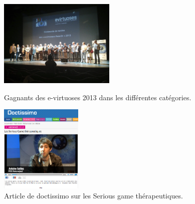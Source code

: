 \begin{figure}[htbp]
	\begin{minipage}[c]{.45\linewidth}
		\begin{center}
			\includegraphics[width=210px, height=157px]{images/remise_awards_e-virtuoses_groupe.jpg}
			\caption{Gagnants des e-virtuoses 2013 dans les différentes catégories.}
			\label{Gagnants}
		\end{center}
	\end{minipage}
	\hfill
	\begin{minipage}[c]{.45\linewidth}
		\begin{center}
			\includegraphics[height=157px]{images/doctissimo.png}
			\caption{Article de doctissimo sur les Serious game thérapeutiques.}
			\label{naturalpad_groupe}
		\end{center}
	\end{minipage}
\end{figure}		

